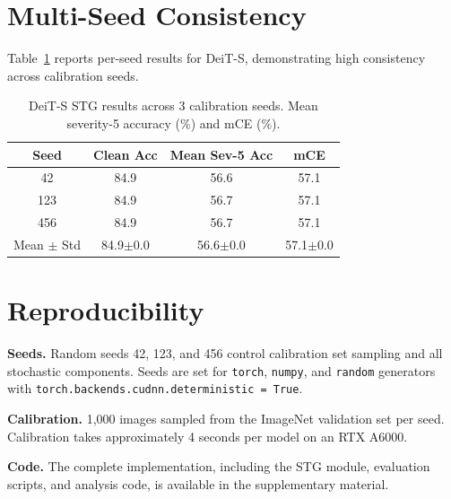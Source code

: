 \documentclass{article}
\newcommand{\methodname}{STG}
\begin{document}
\section{Multi-Seed Consistency}
\label{app:seeds}

Table~\ref{tab:seeds} reports per-seed results for DeiT-S, demonstrating high consistency across calibration seeds.

\begin{table}[h]
\centering
\caption{DeiT-S \methodname{} results across 3 calibration seeds. Mean severity-5 accuracy (\%) and mCE (\%).}
\label{tab:seeds}
\begin{tabular}{cccc}
\toprule
Seed & Clean Acc & Mean Sev-5 Acc & mCE \\
\midrule
42 & 84.9 & 56.6 & 57.1 \\
123 & 84.9 & 56.7 & 57.1 \\
456 & 84.9 & 56.7 & 57.1 \\
\midrule
Mean $\pm$ Std & 84.9$\pm$0.0 & 56.6$\pm$0.0 & 57.1$\pm$0.0 \\
\bottomrule
\end{tabular}
\end{table}

\section{Reproducibility}
\label{app:reproducibility}

\textbf{Seeds.} Random seeds 42, 123, and 456 control calibration set sampling and all stochastic components. Seeds are set for \texttt{torch}, \texttt{numpy}, and \texttt{random} generators with \texttt{torch.backends.cudnn.deterministic = True}.

\textbf{Calibration.} 1,000 images sampled from the ImageNet validation set per seed. Calibration takes approximately 4 seconds per model on an RTX A6000.

\textbf{Code.} The complete implementation, including the \methodname{} module, evaluation scripts, and analysis code, is available in the supplementary material.
\end{document}
